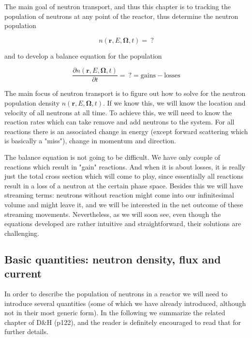 The main goal of neutron transport, and thus this chapter is to tracking the population of neutrons at any point of the reactor, thus determine the neutron population

\begin{equation}
n(\mathbf{r}, E, \mathbf{\Omega},t) = \:?
\end{equation}

\noindent and to develop a balance equation for the population

\begin{equation}
\frac{\partial n(\mathbf{r}, E, \mathbf{\Omega},t)}{\partial t} = \:? = \text{gains} - \text{losses}
\end{equation}

The main focus of neutron transport is to figure out how to solve for the neutron population density $n(\mathbf{r}, E, \mathbf{\Omega},t)$. If we know this, we will know the location and velocity of all neutrons at all time. To achieve this, we will need to know the reaction rates which can take remove and add neutrons to the system. For all reactions there is an associated change in energy (except forward scattering which is basically a "miss"), change in momentum and direction.

The balance equation is not going to be difficult. We have only couple of reactions which result in "gain" reactions. And when it is about losses, it is really just the total cross section which will come to play, since essentially all reactions result in a loss of a neutron at the certain phase space. Besides this we will have streaming terms: neutrons without reaction might come into our infinitesimal volume and might leave it, and we will be interested in the net outcome of these streaming movements. Nevertheless, as we will soon see, even though the equations developed are rather intuitive and straightforward, their solutions are challenging.

\subsection{Basic quantities: neutron density, flux and current}

In order to describe the population of neutrons in a reactor we will need to introduce several quantities (some of which we have already introduced, although not in their most generic form). In the following we summarize the related chapter of D\&H (p122), and the reader is definitely encouraged to read that for further details.

